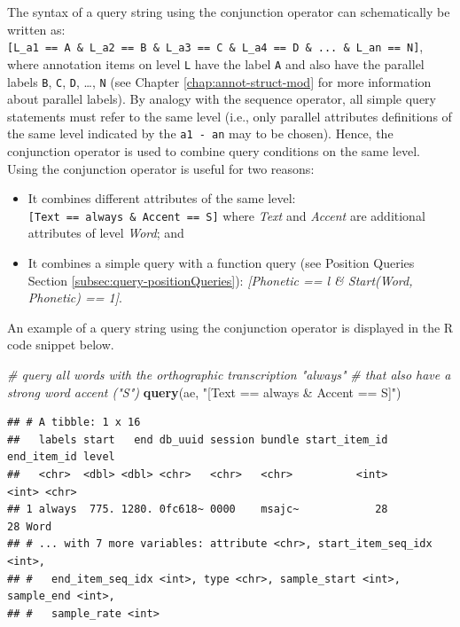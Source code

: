 \documentclass[]{book}
\newenvironment{Shaded}{\begin{snugshade}}{\end{snugshade}}
\newcommand{\CommentTok}[1]{\textcolor[rgb]{0.56,0.35,0.01}{\textit{#1}}}
\newcommand{\KeywordTok}[1]{\textcolor[rgb]{0.13,0.29,0.53}{\textbf{#1}}}
\newcommand{\NormalTok}[1]{#1}
\newcommand{\StringTok}[1]{\textcolor[rgb]{0.31,0.60,0.02}{#1}}
\providecommand{\tightlist}{%
  \setlength{\itemsep}{0pt}\setlength{\parskip}{0pt}}
\begin{document}
The syntax of a query string using the conjunction operator can schematically be written as: \texttt{{[}L\_a1\ ==\ A\ \&\ L\_a2\ ==\ B\ \&\ L\_a3\ ==\ C\ \&\ L\_a4\ ==\ D\ \&\ ...\ \&\ L\_an\ ==\ N{]}}, where annotation items on level \texttt{L} have the label \texttt{A} and also have the parallel labels \texttt{B}, \texttt{C}, \texttt{D}, \ldots{}, \texttt{N} (see Chapter \ref{chap:annot-struct-mod} for more information about parallel labels). By analogy with the sequence operator, all simple query statements must refer to the same level (i.e., only parallel attributes definitions of the same level indicated by the \texttt{a1\ -\ an} may to be chosen). Hence, the conjunction operator is used to combine query conditions on the same level. Using the conjunction operator is useful for two reasons:

\begin{itemize}
\tightlist
\item
  It combines different attributes of the same level: \texttt{{[}Text\ ==\ always\ \&\ Accent\ ==\ S{]}} where \emph{Text} and \emph{Accent} are additional attributes of level \emph{Word}; and
\item
  It combines a simple query with a function query (see Position Queries Section \ref{subsec:query-positionQueries}): \emph{{[}Phonetic == l \& Start(Word, Phonetic) == 1{]}}.
\end{itemize}

An example of a query string using the conjunction operator is displayed in the R code snippet below.

\begin{Shaded}
\begin{Highlighting}[]
\CommentTok{# query all words with the orthographic transcription "always"}
\CommentTok{# that also have a strong word accent ("S")}
\KeywordTok{query}\NormalTok{(ae, }\StringTok{"[Text == always & Accent == S]"}\NormalTok{)}
\end{Highlighting}
\end{Shaded}

\begin{verbatim}
## # A tibble: 1 x 16
##   labels start   end db_uuid session bundle start_item_id end_item_id level
##   <chr>  <dbl> <dbl> <chr>   <chr>   <chr>          <int>       <int> <chr>
## 1 always  775. 1280. 0fc618~ 0000    msajc~            28          28 Word 
## # ... with 7 more variables: attribute <chr>, start_item_seq_idx <int>,
## #   end_item_seq_idx <int>, type <chr>, sample_start <int>, sample_end <int>,
## #   sample_rate <int>
\end{verbatim}
\end{document}
